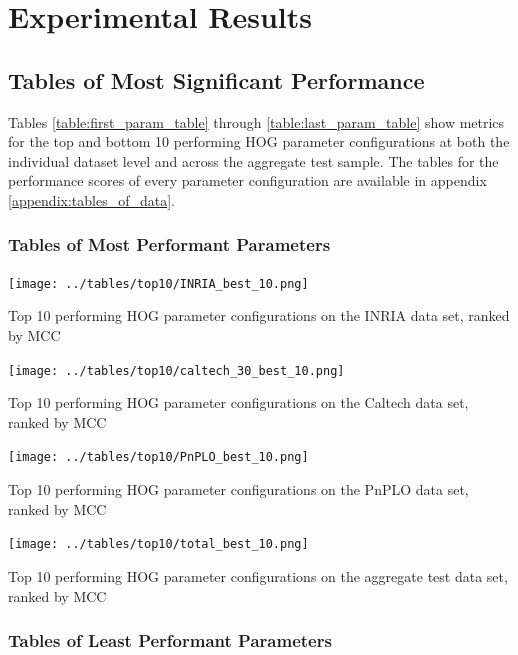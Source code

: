 \section{Experimental Results}

\subsection{Tables of Most Significant Performance}
Tables \ref{table:first_param_table} through \ref{table:last_param_table} show metrics for the top and bottom 10 performing HOG parameter configurations at both the individual dataset level and across the aggregate test sample. The tables for the performance scores of every parameter configuration are available in appendix \ref{appendix:tables_of_data}.
\subsubsection{Tables of Most Performant Parameters}\label{section:best_tables}

\begin{table}
    \centering
    \texttt{[image: ../tables/top10/INRIA\_best\_10.png]}
    \caption{Top 10 performing HOG parameter configurations on the INRIA data set, ranked by MCC}
    \label{table:first_param_table}
\end{table}

\begin{table}
    \centering
    \texttt{[image: ../tables/top10/caltech\_30\_best\_10.png]}
    \caption{Top 10 performing HOG parameter configurations on the Caltech data set, ranked by MCC}
\end{table}

\begin{table}
    \centering
    \texttt{[image: ../tables/top10/PnPLO\_best\_10.png]}
    \caption{Top 10 performing HOG parameter configurations on the PnPLO data set, ranked by MCC}
\end{table}

\begin{table}
    \centering
    \texttt{[image: ../tables/top10/total\_best\_10.png]}
    \caption{Top 10 performing HOG parameter configurations on the aggregate test data set, ranked by MCC}
\end{table}

\subsubsection{Tables of Least Performant Parameters}\label{section:worst_tables}

